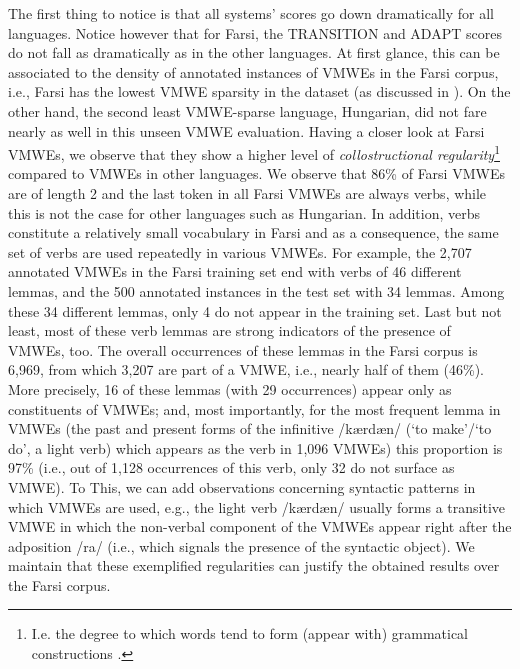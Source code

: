 \documentclass[output=paper
,modfonts
,nonflat,draftmode]{langsci/langscibook}
\begin{document}
The first thing to notice is that all systems' scores go down dramatically for all languages. Notice however that for Farsi, the TRANSITION and ADAPT scores do not fall as dramatically as in the other languages. At first glance, this can be associated to the density of annotated instances of VMWEs in the Farsi corpus, i.e., Farsi has the lowest VMWE sparsity in the dataset (as discussed in ). On the other hand, the second least VMWE-sparse language, Hungarian, did not fare nearly as well in this unseen VMWE evaluation. Having a closer look at Farsi VMWEs, we observe that they show a higher level of \emph{collostructional regularity}\footnote{I.e. the degree to which words tend to form (appear with) grammatical constructions \citep{collostructional}.} compared to VMWEs in other languages. We observe that 86\% of Farsi VMWEs are of length 2 and the last token in all Farsi VMWEs are always verbs, while this is not the case for other languages such as Hungarian. In addition, verbs constitute a relatively small vocabulary in Farsi and as a consequence, the same set of verbs are used repeatedly in various VMWEs. For example, the 2,707 annotated VMWEs in the Farsi training set end with verbs of 46 different lemmas, and the 500 annotated instances in the test set with 34 lemmas. Among these 34 different lemmas, only 4 do not appear in the training set. Last but not least, most of these verb lemmas are strong indicators of the presence of VMWEs, too. The overall occurrences of these lemmas in the Farsi corpus is 6,969, from which 3,207 are part of a VMWE, i.e., nearly half of them (46\%). More precisely, 16 of these lemmas (with 29 occurrences) appear only as constituents of VMWEs; and, most importantly, for the most frequent lemma in VMWEs (the past and present forms of the infinitive {} /kærdæn/ (`to make'/`to do', a light verb) which appears as the verb in 1,096 VMWEs) this proportion is 97\% (i.e., out of 1,128 occurrences of this verb, only 32 do not surface as VMWE). To This, we can add observations concerning syntactic patterns in which VMWEs are used, e.g., the light verb {} /kærdæn/ usually forms a transitive VMWE in which the non-verbal component of the VMWEs appear right after the adposition  {} /ra/ (i.e., which signals the presence of the syntactic object).  We maintain that these exemplified regularities can justify the obtained results over the Farsi corpus.  
\end{document}
